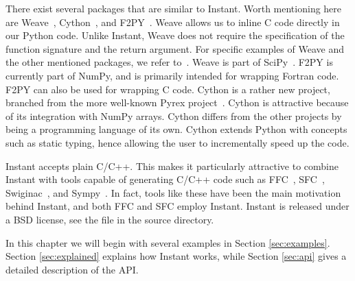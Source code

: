 There exist several packages that are similar to Instant. 
Worth mentioning here are Weave~\cite{Weave}, 
Cython~\cite{Cython}, and F2PY~\cite{F2PY}. 
Weave allows us to inline C code directly in our Python
code. Unlike Instant, Weave does not require the specification of the function
signature and the return argument. For specific examples of Weave and the
other mentioned packages, we refer to~\cite{Wilbers09,Weave}. Weave is part of
SciPy~\cite{SciPy}. 
F2PY is currently part of NumPy, and is primarily intended
for wrapping Fortran code. F2PY can also be used for wrapping C
code. 
Cython is a rather new project, branched from the more well-known Pyrex
project~\cite{Pyrex}. Cython is attractive because of  its integration
with NumPy arrays. Cython differs from the other projects by being a programming
language of its own. Cython extends Python with concepts such as static typing,  
hence allowing the user to incrementally speed up the code.

Instant accepts plain C/C++. This makes it particularly attractive to combine
Instant with tools capable of generating C/C++ code such as FFC~\cite{FFC},
SFC~\cite{SFC}, Swiginac~\cite{Swiginac}, and Sympy~\cite{Sympy}.  In fact,
tools like these have been the main motivation behind Instant, and both FFC
and SFC employ Instant. Instant is released under a BSD license, see the
file  in the source directory.

In this chapter we will begin with several examples in Section \ref{sec:examples}.  
Section \eqref{sec:explained} explains how Instant works, while 
Section \eqref{sec:api} gives a detailed description of the API. 


